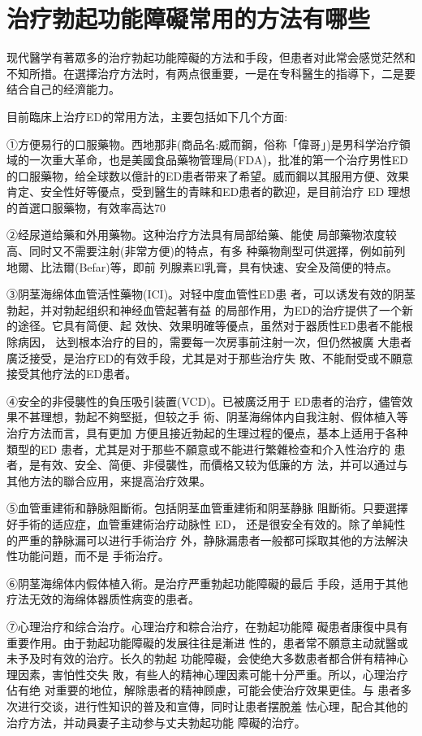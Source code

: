 \documentclass[12pt,UTF8]{ctexbook}
\begin{document}
\section{治疗勃起功能障礙常用的方法有哪些}

现代醫学有著眾多的治疗勃起功能障礙的方法和手段，但患者对此常会感觉茫然和不知所措。在選擇治疗方法时，有两点很重要，一是在专科醫生的指導下，二是要结合自己的经濟能力。

目前臨床上治疗ED的常用方法，主要包括如下几个方面:

①方便易行的口服藥物。西地那非(商品名:威而鋼，俗称「偉哥」)是男科学治疗領域的一次重大革命，也是美國食品藥物管理局(FDA)，批准的第一个治疗男性ED的口服藥物，给全球数以億計的ED患者带来了希望。威而鋼以其服用方便、效果肯定、安全性好等優点，受到醫生的青睐和ED患者的歡迎，是目前治疗 ED 理想的首選口服藥物，有效率高达70%

②经尿道给藥和外用藥物。这种治疗方法具有局部给藥、能使
局部藥物浓度较高、同时又不需要注射(非常方便)的特点，有多
种藥物劑型可供選擇，例如前列地爾、比法爾(Befar)等，即前
列腺素El乳膏，具有快速、安全及简便的特点。

③阴茎海绵体血管活性藥物(ICI)。对轻中度血管性ED患
者，可以诱发有效的阴茎勃起，并对勃起组织和神经血管起著有益
的局部作用，为ED的治疗提供了一个新的途径。它具有简便、起
效快、效果明確等優点，虽然对于器质性ED患者不能根除病因，
达到根本治疗的目的，需要每一次房事前注射一次，但仍然被廣
大患者廣泛接受，是治疗ED的有效手段，尤其是对于那些治疗失
敗、不能耐受或不願意接受其他疗法的ED患者。

④安全的非侵襲性的負压吸引装置(VCD)。已被廣泛用于
ED患者的治疗，儘管效果不甚理想，勃起不夠堅挺，但较之手
術、阴茎海绵体内自我注射、假体植入等治疗方法而言，具有更加
方便且接近勃起的生理过程的優点，基本上适用于各种類型的ED
患者，尤其是对于那些不願意或不能进行繁雜检查和介入性治疗的
患者，是有效、安全、简便、非侵襲性，而價格又较为低廉的方
法，并可以通过与其他方法的聯合应用，来提高治疗效果。

⑤血管重建術和静脉阻斷術。包括阴茎血管重建術和阴茎静脉
阻斷術。只要選擇好手術的适应症，血管重建術治疗动脉性 ED，
还是很安全有效的。除了单純性的严重的静脉漏可以进行手術治疗
外，静脉漏患者一般都可採取其他的方法解決性功能问題，而不是
手術治疗。

⑥阴茎海绵体内假体植入術。是治疗严重勃起功能障礙的最后
手段，适用于其他疗法无效的海绵体器质性病变的患者。

⑦心理治疗和综合治疗。心理治疗和粽合治疗，在勃起功能障
礙患者康復中具有重要作用。由于勃起功能障礙的发展往往是漸进
性的，患者常不願意主动就醫或未予及时有效的治疗。长久的勃起
功能障礙，会使绝大多数患者都合併有精神心理因素，害怕性交失
敗，有些人的精神心理因素可能十分严重。所以，心理治疗佔有绝
对重要的地位，解除患者的精神顾慮，可能会使治疗效果更佳。与
患者多次进行交谈，进行性知识的普及和宣傳，同时让患者摆脫羞
怯心理，配合其他的治疗方法，并动員妻子主动参与丈夫勃起功能
障礙的治疗。
\end{document}
